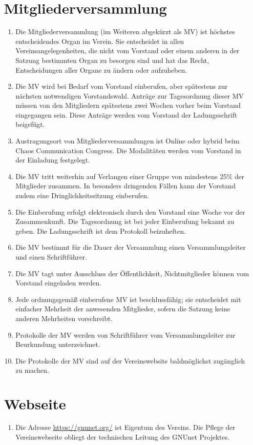 \documentclass[german,a4paper]{article} %
\newenvironment{enumpar}{%
  \renewcommand{\labelenumi}{\theenumi}%
  \renewcommand{\theenumi}{(\arabic{enumi})}%
  \renewcommand{\labelenumii}{\theenumii}%
  \renewcommand{\theenumii}{(\alph{enumii})}%
  \begin{enumerate}}
{\end{enumerate}}
\begin{document}
\section{Mitgliederversammlung}
\label{Mitgliederversammlung}
\begin{enumpar}
\item Die Mitgliederversammlung (im Weiteren abgekürzt als \glqq MV\grqq ) ist höchstes entscheidendes Organ im Verein. Sie entscheidet in allen Vereinsangelegenheiten, die nicht vom Vorstand oder einem anderen in der Satzung bestimmten Organ zu besorgen sind und hat das Recht, Entscheidungen aller Organe zu ändern oder aufzuheben.
\item Die MV wird bei Bedarf vom Vorstand einberufen, aber spätestens zur nächsten notwendigen Vorstandswahl.
  Anträge zur Tagesordnung dieser MV müssen von den Mitgliedern spätestens zwei Wochen vorher beim Vorstand eingegangen sein. Diese Anträge werden vom Vorstand der Ladungsschrift beigefügt.
\item Austragungsort von Mitgliederversammlungen ist Online oder hybrid beim Chaos Communication Congress. Die Modalitäten werden vom Vorstand in der Einladung festgelegt.
\item Die MV tritt weiterhin auf Verlangen einer Gruppe von mindestens 25\% der Mitglieder zusammen. In besonders dringenden Fällen kann der Vorstand zudem eine Dringlichkeitssitzung einberufen.
\item Die Einberufung erfolgt elektronisch durch den Vorstand eine Woche vor der Zusammenkunft. Die Tagesordnung ist bei jeder Einberufung bekannt zu geben. Die Ladungsschrift ist dem Protokoll beizuheften.
\item Die MV bestimmt für die Dauer der Versammlung einen Versammlungsleiter und einen Schriftführer.
\item Die MV tagt unter Ausschluss der Öffentlichkeit, Nichtmitglieder können vom Vorstand eingeladen werden.
\item Jede ordnungsgemäß einberufene MV ist beschlussfähig; sie entscheidet mit einfacher Mehrheit der anwesenden Mitglieder, sofern die Satzung keine anderen Mehrheiten vorschreibt.
\item Protokolle der MV werden von Schriftführer vom Versammlungsleiter zur Beurkundung unterzeichnet.
\item Die Protokolle der MV sind auf der Vereinswebsite baldmöglichst zugänglich zu machen.
\end{enumpar}

\section{Webseite}
\label{Webseite}
\begin{enumpar}
\item Die Adresse \url{https://gnunet.org/} ist Eigentum des Vereins. Die Pflege der Vereinswebseite obliegt der technischen Leitung des GNUnet Projektes.
\end{enumpar}
\end{document}
